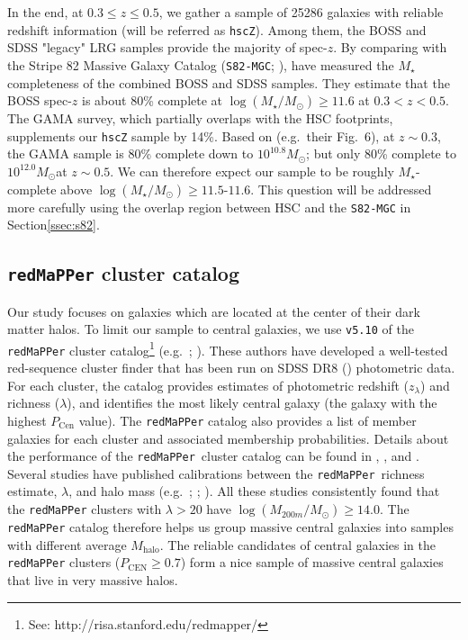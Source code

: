 \documentclass{emulateapj}
\def\msun{$M_\odot$}
\def\redm{\texttt{redMaPPer}}
\def\mstar{{$M_{\star}$}}
\def\mhalo{{$M_{\mathrm{halo}}$}}
\def\logms{{$\log (M_{\star}/M_{\odot})$}}
\begin{document}
\begin{CJK*}{UTF8}{gbsn}
    In the end, at $0.3 \leq z \leq 0.5$, we gather a sample of 25286 galaxies with 
    reliable redshift information (will be referred as \texttt{hscZ}).
    Among them, the BOSS and SDSS "legacy" LRG samples provide the majority of 
    spec-$z$. 
    By comparing with the Stripe 82 Massive Galaxy Catalog
    (\texttt{S82-MGC}; \citealt{Bundy2015}), \citet{Leauthaud2016} have measured the
    \mstar{} completeness of the combined BOSS and SDSS samples. 
    They estimate that the BOSS spec-$z$ is about 80\% complete at \logms{}$\geq 11.6$ 
    at $0.3 < z < 0.5$. 
    The GAMA survey, which partially overlaps with the HSC footprints, supplements 
    our \texttt{hscZ} sample by 14\%. 
    Based on \citet{Taylor2011} (e.g.\ their Fig.~6), at $z\sim 0.3$, the GAMA 
    sample is 80\% complete down to $10^{10.8}$\msun; but only 80\% complete to 
    $10^{12.0}$\msun at $z\sim 0.5$. 
    We can therefore expect our sample to be roughly \mstar{}-complete above 
    \logms{}$\geq 11.5$-$11.6$. 
    This question will be addressed more carefully using the overlap region between 
    HSC and the \texttt{S82-MGC} in Section\ref{ssec:s82}.

\subsection{\redm{}{} cluster catalog}
    \label{ssec:redmapper}
    
    Our study focuses on galaxies which are located at the center of their dark matter 
    halos. 
    To limit our sample to central galaxies, we use \texttt{v5.10} of the \redm{}{} 
    cluster catalog\footnote{See: http://risa.stanford.edu/redmapper/} 
    (e.g.\ \citealt{Rykoff2014}; \citealt{Rozo2015b}). 
    These authors have developed a well-tested red-sequence cluster finder that has 
    been run on SDSS DR8 (\citealt{SDSSDR8}) photometric data. 
    For each cluster, the catalog provides estimates of photometric redshift 
    ($z_{\lambda}$) and richness ($\lambda$), and identifies the most likely central
    galaxy (the galaxy with the highest $P_{\mathrm{Cen}}$ value). 
    The \redm{}{} catalog also provides a list of member galaxies for each cluster 
    and associated membership probabilities. 
    Details about the performance of the \redm{}~cluster catalog can be found in 
    \citet{Rozo2014}, \citet{Rozo2015a}, and \citet{Rozo2015b}. 
    Several studies have published calibrations between the \redm{}~richness estimate, 
    $\lambda$, and halo mass (e.g.\ \citealt{Saro2015}; \citealt{Farahi2016}; 
    \citealt{Simet2016}). 
    All these studies consistently found that the \redm{} clusters with $\lambda > 20$ 
    have $\log (M_{200m}/M_{\odot}) \geq 14.0$.
    The \redm{} catalog therefore helps us group massive central galaxies into samples 
    with different average \mhalo{}. 
    The reliable candidates of central galaxies in the \redm{} clusters 
    ($P_{\mathrm{CEN}} \geq 0.7$) form a nice sample of massive central galaxies 
    that live in very massive halos. 
    

\end{CJK*}
\end{document}
